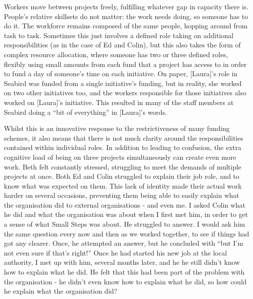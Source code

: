 Workers move between projects freely, fulfilling whatever gap in capacity there is. People's relative skillsets do not matter: the work needs doing, so someone has to do it. The workforce remains composed of the same people, hopping around from task to task. Sometimes this just involves a defined role taking on additional responsibilities (as in the case of Ed and Colin), but this also takes the form of complex resource allocation, where someone has two or three defined roles, flexibly using small amounts from each fund that a project has access to in order to fund a day of someone’s time on each initiative. On paper, [Laura]'s role in Seabird was funded from a single initiative’s funding, but in reality, she worked on two other initiatives too, and the workers responsible for those initiatives also worked on [Laura]’s initiative. This resulted in many of the staff members at Seabird doing a “bit of everything” in [Laura]’s words. 

Whilst this is an innovative response to the restrictiveness of many funding schemes, it also means that there is not much clarity around the responsibilities contained within individual roles. In addition to leading to confusion, the extra cognitive load of being on three projects simultaneously can create even more work. Beth felt constantly stressed, struggling to meet the demands of multiple projects at once. Both Ed and Colin struggled to explain their job role, and to know what was expected on them. This lack of identity made their actual work harder on several occasions, preventing them being able to easily explain what the organisation did to external organisations - and even me. I asked Colin what he did and what the organisation was about when I first met him, in order to get a sense of what Small Steps was about. He struggled to answer. I would ask him the same question every now and then as we worked together, to see if things had got any clearer. Once, he attempted an answer, but he concluded with “but I’m not even sure if that’s right!” Once he had started his new job at the local authority, I met up with him, several months later, and he he still didn't know how to explain what he did. He felt that this had been part of the problem with the organisation - he didn't even know how to explain what he did, so how could he explain what the organisation did?


